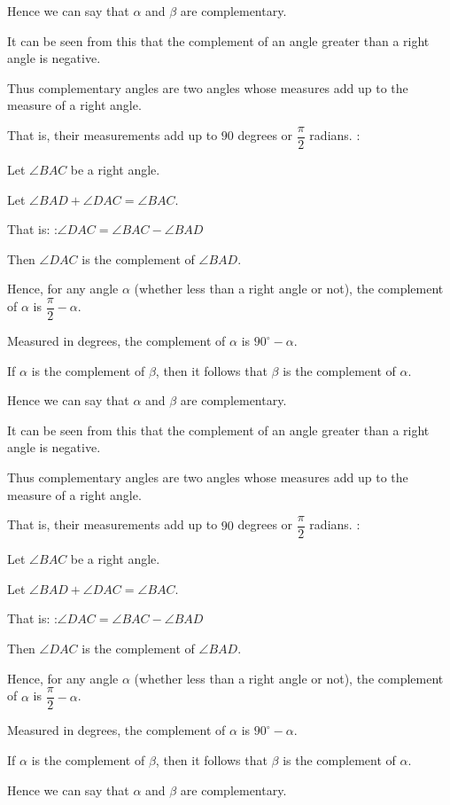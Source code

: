 Hence we can say that $\alpha$ and $\beta$ are complementary.


It can be seen from this that the complement of an angle greater than a right angle is negative.


Thus complementary angles are two angles whose measures add up to the measure of a right angle.

That is, their measurements add up to $90$ degrees or $\dfrac \pi 2$ radians.
:

Let $\angle BAC$ be a right angle.

Let $\angle BAD + \angle DAC = \angle BAC$.

That is:
:$\angle DAC = \angle BAC - \angle BAD$


Then $\angle DAC$ is the complement of $\angle BAD$.


Hence, for any angle $\alpha$ (whether less than a right angle or not), the complement of $\alpha$ is $\dfrac \pi 2 - \alpha$.

Measured in degrees, the complement of $\alpha$ is $90^\circ - \alpha$.


If $\alpha$ is the complement of $\beta$, then it follows that $\beta$ is the complement of $\alpha$.

Hence we can say that $\alpha$ and $\beta$ are complementary.


It can be seen from this that the complement of an angle greater than a right angle is negative.


Thus complementary angles are two angles whose measures add up to the measure of a right angle.

That is, their measurements add up to $90$ degrees or $\dfrac \pi 2$ radians.
:

Let $\angle BAC$ be a right angle.

Let $\angle BAD + \angle DAC = \angle BAC$.

That is:
:$\angle DAC = \angle BAC - \angle BAD$


Then $\angle DAC$ is the complement of $\angle BAD$.


Hence, for any angle $\alpha$ (whether less than a right angle or not), the complement of $\alpha$ is $\dfrac \pi 2 - \alpha$.

Measured in degrees, the complement of $\alpha$ is $90^\circ - \alpha$.


If $\alpha$ is the complement of $\beta$, then it follows that $\beta$ is the complement of $\alpha$.

Hence we can say that $\alpha$ and $\beta$ are complementary.


